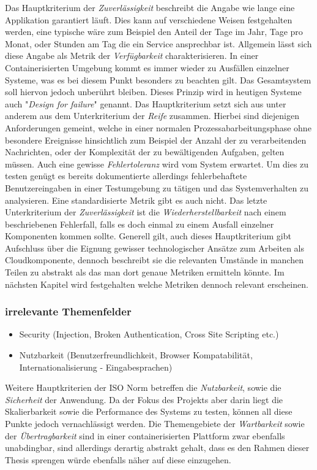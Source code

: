 Das Hauptkriterium der \emph{Zuverlässigkeit} beschreibt die Angabe wie lange eine Applikation garantiert läuft. Dies kann auf verschiedene Weisen festgehalten werden, eine typische wäre zum Beispiel den Anteil der Tage im Jahr, Tage pro Monat, oder Stunden am Tag die ein Service ansprechbar ist. Allgemein lässt sich diese Angabe als Metrik der \emph{Verfügbarkeit} charakterisieren. In einer Containerisierten Umgebung kommt es immer wieder zu Ausfällen einzelner Systeme, was es bei diesem Punkt besonders zu beachten gilt. Das Gesamtsystem soll hiervon jedoch unberührt bleiben. Dieses Prinzip wird in heutigen Systeme auch "\emph{Design for failure}" genannt. Das Hauptkriterium setzt sich aus unter anderem aus dem Unterkriterium der \emph{Reife} zusammen. Hierbei sind diejenigen Anforderungen gemeint, welche in einer normalen Prozessabarbeitungsphase ohne besondere Ereignisse hinsichtlich zum Beispiel der Anzahl der zu verarbeitenden Nachrichten, oder der Komplexität der zu bewältigenden Aufgaben, gelten müssen. Auch eine gewisse \emph{Fehlertoleranz} wird vom System erwartet. Um dies zu testen genügt es bereits dokumentierte allerdings fehlerbehaftete Benutzereingaben in einer Testumgebung zu tätigen und das Systemverhalten zu analysieren. Eine standardisierte Metrik gibt es auch nicht. Das letzte Unterkriterium der \emph{Zuverlässigkeit} ist die \emph{Wiederherstellbarkeit} nach einem beschriebenen Fehlerfall, falls es doch einmal zu einem Ausfall einzelner Komponenten kommen sollte. Generell gilt, auch dieses Hauptkriterium gibt Aufschluss über die Eignung gewisser technologischer Ansätze zum Arbeiten als Cloudkomponente, dennoch beschreibt sie die relevanten Umstände in manchen Teilen zu abstrakt als das man dort genaue Metriken ermitteln könnte. Im nächsten Kapitel wird festgehalten welche Metriken dennoch relevant erscheinen. 

\subsubsection{irrelevante Themenfelder}
\begin{itemize}
  \item Security (Injection, Broken Authentication, Cross Site Scripting etc.)
  \item Nutzbarkeit (Benutzerfreundlichkeit, Browser Kompatabilität, Internationalisierung - Eingabesprachen)
\end{itemize}

Weitere Hauptkriterien der ISO Norm betreffen die \emph{Nutzbarkeit}, sowie die \emph{Sicherheit} der Anwendung. Da der Fokus des Projekts aber darin liegt die Skalierbarkeit sowie die Performance des Systems zu testen, können all diese Punkte jedoch vernachlässigt werden. Die Themengebiete der \emph{Wartbarkeit} sowie der \emph{Übertragbarkeit} sind in einer containerisierten Plattform zwar ebenfalls unabdingbar, sind allerdings derartig abstrakt gehalt, dass es den Rahmen dieser Thesis sprengen würde ebenfalls näher auf diese einzugehen. 

